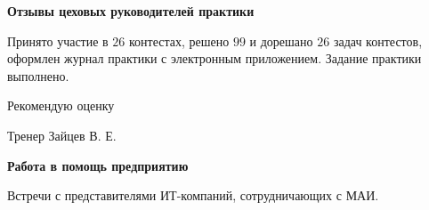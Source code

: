 \begin{center}
\bfseries{\large Отзывы цеховых руководителей практики}
\end{center}

Принято участие в $26$ контестах, решено $99$ и дорешано $26$ задач контестов, оформлен журнал практики с электронным приложением. Задание практики выполнено.

Рекомендую оценку

\vspace{15pt}

\hfill Тренер Зайцев В. Е. 

\vspace{200pt}

\begin{center}
\bfseries{\large Работа в помощь предприятию}
\end{center}

Встречи с представителями ИТ-компаний, сотрудничающих с МАИ.

\pagebreak
